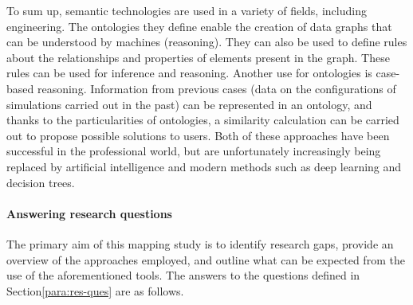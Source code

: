            To sum up, semantic technologies are used in a variety of fields, including engineering. The ontologies they define enable the creation of data graphs that can be understood by machines (reasoning). They can also be used to define rules about the relationships and properties of elements present in the graph. These rules can be used for inference and reasoning. Another use for ontologies is case-based reasoning. Information from previous cases (data on the configurations of simulations carried out in the past) can be represented in an ontology, and thanks to the particularities of ontologies, a similarity calculation can be carried out to propose possible solutions to users. Both of these approaches have been successful in the professional world, but are unfortunately increasingly being replaced by artificial intelligence and modern methods such as deep learning and decision trees.\\

            
            \paragraph{Answering research questions\label{para:sms_ans_rq}}
            The primary aim of this mapping study is to identify research gaps, provide an overview of the approaches employed, and outline what can be expected from the use of the aforementioned tools. The answers to the questions defined in Section\ref{para:res-ques} are as follows.\\


